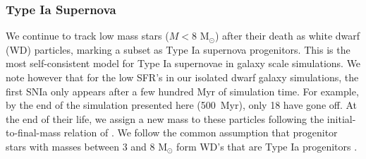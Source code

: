 \documentclass[twocolumn]{aastex61}
\begin{document}
\subsubsection{Type Ia Supernova}
\label{sec:Type Ia}
We continue to track low mass stars ($M < 8$ M$_{\odot}$) after their death as white dwarf (WD) particles, marking a subset as Type Ia supernova progenitors. This is the most self-consistent model for Type Ia supernovae in galaxy scale simulations. We note however that for the low SFR's in our isolated dwarf galaxy simulations, the first SNIa only appears after a few hundred Myr of simulation time. For example, by the end of the simulation presented here (500~Myr), only 18 have gone off. At the end of their life, we assign a new mass to these particles following the initial-to-final-mass relation of \citet{Salaris2009}.
We follow the common assumption that progenitor stars with masses between 3 and 8 M$_{\odot}$ form WD's that are Type Ia progenitors \citep[see][ and references therein]{Cote2017}. 
\end{document}
